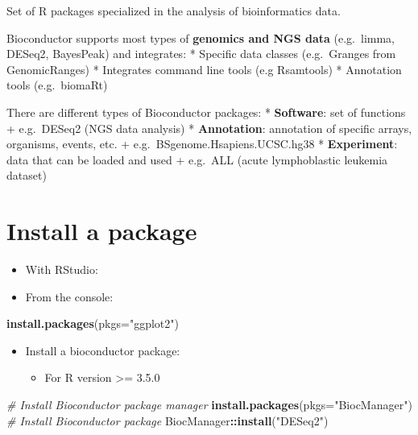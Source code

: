 \documentclass[]{book}
\newenvironment{Shaded}{\begin{snugshade}}{\end{snugshade}}
\newcommand{\CommentTok}[1]{\textcolor[rgb]{0.56,0.35,0.01}{\textit{#1}}}
\newcommand{\DataTypeTok}[1]{\textcolor[rgb]{0.13,0.29,0.53}{#1}}
\newcommand{\KeywordTok}[1]{\textcolor[rgb]{0.13,0.29,0.53}{\textbf{#1}}}
\newcommand{\NormalTok}[1]{#1}
\newcommand{\OperatorTok}[1]{\textcolor[rgb]{0.81,0.36,0.00}{\textbf{#1}}}
\newcommand{\StringTok}[1]{\textcolor[rgb]{0.31,0.60,0.02}{#1}}
\providecommand{\tightlist}{%
  \setlength{\itemsep}{0pt}\setlength{\parskip}{0pt}}
\begin{document}
Set of R packages specialized in the analysis of bioinformatics data.

Bioconductor supports most types of \textbf{genomics and NGS data} (e.g.~limma, DESeq2, BayesPeak) and integrates:
* Specific data classes (e.g.~Granges from GenomicRanges)
* Integrates command line tools (e.g Rsamtools)
* Annotation tools (e.g.~biomaRt)

There are different types of Bioconductor packages:
* \textbf{Software}: set of functions
+ e.g.~DESeq2 (NGS data analysis)
* \textbf{Annotation}: annotation of specific arrays, organisms, events, etc.
+ e.g.~BSgenome.Hsapiens.UCSC.hg38
* \textbf{Experiment}: data that can be loaded and used
+ e.g.~ALL (acute lymphoblastic leukemia dataset)

\hypertarget{install-a-package}{%
\section{Install a package}\label{install-a-package}}

\begin{itemize}
\item
  With RStudio:
\item
  From the console:
\end{itemize}

\begin{Shaded}
\begin{Highlighting}[]
\KeywordTok{install.packages}\NormalTok{(}\DataTypeTok{pkgs=}\StringTok{"ggplot2"}\NormalTok{)}
\end{Highlighting}
\end{Shaded}

\begin{itemize}
\tightlist
\item
  Install a bioconductor package:

  \begin{itemize}
  \tightlist
  \item
    For R version \textgreater{}= 3.5.0
  \end{itemize}
\end{itemize}

\begin{Shaded}
\begin{Highlighting}[]
\CommentTok{# Install Bioconductor package manager}
\KeywordTok{install.packages}\NormalTok{(}\DataTypeTok{pkgs=}\StringTok{"BiocManager"}\NormalTok{)}
\CommentTok{# Install Bioconductor package}
\NormalTok{BiocManager}\OperatorTok{::}\KeywordTok{install}\NormalTok{(}\StringTok{"DESeq2"}\NormalTok{)}
\end{Highlighting}
\end{Shaded}
\end{document}
